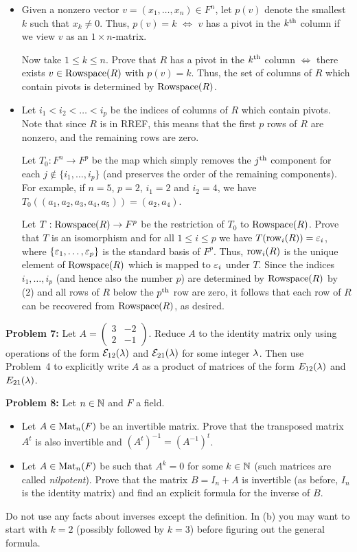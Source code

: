 \documentclass[11pt]{amsart}
\begin{document}
\begin{itemize}
\item[(2)] Given a nonzero vector $v=(x_1,\ldots, x_n)\in F^n$, let $p(v)$ denote the smallest $k$ such that $x_k\neq 0$.
Thus, $p(v)=k$ $\iff$ $v$ has a pivot in the $k^{\rm th}$ column if we view $v$ as an $1\times n$-matrix.

Now take $1\leq k\leq n$.
Prove that $R$ has a pivot in the $k^{\rm th}$ column $\iff$ there exists $v\in {\rm Rowspace}(R)$ with $p(v)=k$. Thus, the set of columns of $R$
which contain pivots is determined by ${\rm Rowspace}(R)$. 
\item[(3)] Let $i_1<i_2<\ldots<i_p$ be the indices of columns of $R$ which contain pivots. Note that since $R$ is in RREF, this means
that the first $p$ rows of $R$ are nonzero, and the remaining rows are zero.

Let $T_0: F^n\to F^p$ be the map
which simply removes the $j^{\rm th}$ component for each $j\not\in\{i_1,\ldots, i_p\}$ (and preserves the order of the remaining components).
For example, if $n=5$, $p=2$, $i_1=2$ and $i_2=4$, we have $T_0((a_1,a_2,a_3,a_4,a_5))=(a_2,a_4)$. 

Let $T:{\rm Rowspace}(R)\to F^p$ be the restriction of $T_0$ to ${\rm Rowspace}(R)$. Prove that $T$ is an isomorphism and
for all $1\leq i\leq p$ we have $T({\rm row}_i(R))={\varepsilon}_i$, where $\{{\varepsilon}_1,\ldots, {\varepsilon}_p\}$ is the standard basis of $F^p$. Thus,
${\rm row}_i(R)$ is the unique element of ${\rm Rowspace}(R)$ which is mapped to ${\varepsilon}_i$ under $T$. Since the indices $i_1,\ldots, i_p$ (and hence
also the number $p$) are determined by ${\rm Rowspace}(R)$ by (2) and all rows of $R$ below the $p^{\rm th}$ row are zero, it follows that each row of $R$ can be recovered from ${\rm Rowspace}(R)$, as desired.
\end{itemize}

\skv
{\bf Problem 7:} Let $A=\begin{pmatrix} 3 & -2 \\ 2 & -1\end{pmatrix}$. Reduce $A$ to the identity matrix only using operations of the form
$\mathcal E_{12}({\lambda})$ and $\mathcal E_{21}({\lambda})$ for some integer ${\lambda}$. Then use Problem~4 to explicitly write $A$ as a product of matrices of the form $E_{12}({\lambda})$ and $E_{21}({\lambda})$.
\skv

{\bf Problem 8:} Let $n\in{\mathbb N}$ and $F$ a field.
\begin{itemize}
\item[(a)] Let $A\in {\rm Mat}_n(F)$ be an invertible matrix. Prove that the transposed matrix $A^t$ is also invertible and 
$(A^t)^{-1}=(A^{-1})^t$.
\item[(b)] Let $A\in {\rm Mat}_n(F)$ be such that $A^k=0$ for some $k\in{\mathbb N}$ (such matrices are called \emph{nilpotent}). Prove that
the matrix $B=I_n+A$ is invertible (as before, $I_n$ is the identity matrix) and find an explicit formula for the inverse of $B$.
\end{itemize}
Do not use any facts about inverses except the definition. In (b) you may want to start with $k=2$ (possibly followed by $k=3$) before
figuring out the general formula.
\end{document}
